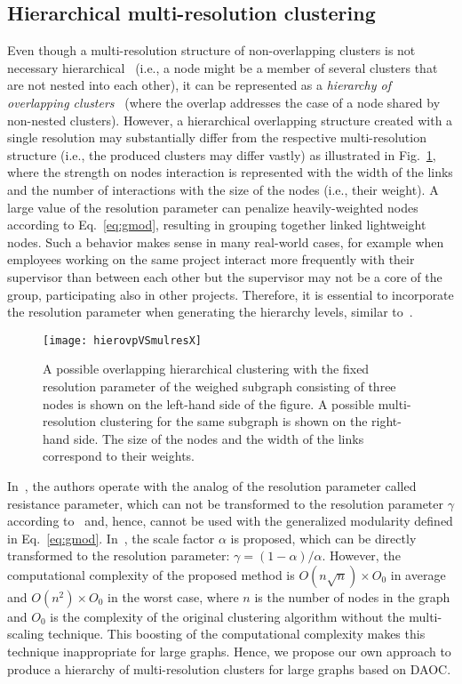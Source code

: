 \documentclass[conference]{IEEEtran}
\begin{document}
\subsection{Hierarchical multi-resolution clustering}

Even though a multi-resolution structure of non-overlapping clusters is not necessary hierarchical~\cite{Aren08,Lamb10} (i.e., a node might be a member of several clusters that are not nested into each other), it can be represented as a \emph{hierarchy of overlapping clusters}~\cite{Lanc09} (where the overlap addresses the case of a node shared by non-nested clusters). However, a hierarchical overlapping structure created with a single resolution may substantially differ from the respective multi-resolution structure (i.e., the produced clusters may differ vastly) as illustrated in Fig.~\ref{fig:hovp_mres}, where the strength on nodes interaction is represented with the width of the links and the number of interactions with the size of the nodes (i.e., their weight). A large value of the resolution parameter can penalize heavily-weighted nodes according to Eq.~\eqref{eq:gmod}, resulting in grouping together linked lightweight nodes. Such a behavior makes sense in many real-world cases, for example when employees working on the same project interact more frequently with their supervisor than between each other but the supervisor may not be a core of the group, participating also in other projects.
Therefore, it is essential to incorporate the resolution parameter when generating the hierarchy levels, similar to~\cite{Aren08,Pons11,Gran12}.
\begin{figure}[htbp]\centering  \texttt{[image: hierovpVSmulresX]}
\caption{A possible overlapping hierarchical clustering with the fixed resolution parameter of the weighed subgraph consisting of three nodes is shown on the left-hand side of the figure. A possible multi-resolution clustering for the same subgraph is shown on the right-hand side. The size of the nodes and the width of the links correspond to their weights.
}
\label{fig:hovp_mres}
\end{figure}

In~\cite{Aren08,Gran12}, the authors operate with the analog of the resolution parameter called resistance parameter, which can not be transformed to the resolution parameter $\gamma$ according to~\cite{Aren08r} and, hence, cannot be used with the generalized modularity defined in Eq.~\eqref{eq:gmod}. In~\cite{Pons11}, the scale factor $\alpha$ is proposed, which can be directly transformed to the resolution parameter: $\gamma = (1 - \alpha)/\alpha$. However, the computational complexity of the proposed method is $O(n\sqrt{n}) \times O_0$ in average and $O(n^2) \times O_0$ in the worst case, where $n$ is the number of nodes in the graph and $O_0$ is the complexity of the original clustering algorithm without the multi-scaling technique. This boosting of the computational complexity makes this technique inappropriate for large graphs. Hence, we propose our own approach to produce a hierarchy of multi-resolution clusters for large graphs based on DAOC.
\end{document}
